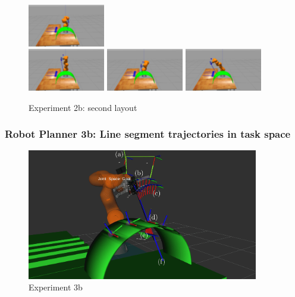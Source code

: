\begin{frame}
\begin{center}
\begin{figure}[!htb]
\includegraphics[width=0.3\textwidth]{../images/robot_planner2b/robot_planner2b_6}\\
\includegraphics[width=0.3\textwidth]{../images/robot_planner2b/robot_planner2b_7}
\includegraphics[width=0.3\textwidth]{../images/robot_planner2b/robot_planner2b_8}
\includegraphics[width=0.3\textwidth]{../images/robot_planner2b/robot_planner2b_9}\\
\caption{Experiment 2b: second layout}
\end{figure}
\end{center}
\end{frame}


\begin{frame}
\frametitle{Robot Planner 3b: Line segment trajectories in task space}
\begin{center}
\begin{figure}[!htb]
\centering
\includegraphics[width=0.9\textwidth]{../images/robot_planner3/3b_line_seg.png}
\caption{Experiment 3b}
\end{figure}
\end{center}
\end{frame}

